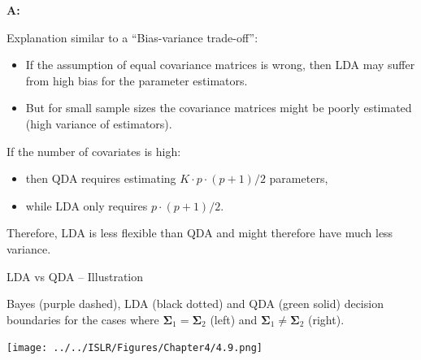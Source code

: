 \documentclass[10pt,ignorenonframetext,]{beamer}
\providecommand{\tightlist}{%
  \setlength{\itemsep}{0pt}\setlength{\parskip}{0pt}}
\begin{document}
\begin{frame}

\textbf{A:}

Explanation similar to a ``Bias-variance trade-off'':

\begin{itemize}
\tightlist
\item
  If the assumption of equal covariance matrices is wrong, then LDA may
  suffer from high bias for the parameter estimators.
\item
  But for small sample sizes the covariance matrices might be poorly
  estimated (high variance of estimators).
\end{itemize}

If the number of covariates is high:

\begin{itemize}
\tightlist
\item
  then QDA requires estimating \(K\cdot p \cdot (p+1)/2\) parameters,
\item
  while LDA only requires \(p\cdot(p+1)/2\).
\end{itemize}

Therefore, LDA is less flexible than QDA and might therefore have much
less variance.

\end{frame}

\begin{frame}

\begin{block}{LDA vs QDA -- Illustration}

\vspace{1mm}

Bayes (purple dashed), LDA (black dotted) and QDA (green solid) decision
boundaries for the cases where
\(\boldsymbol{\Sigma}_1 = \boldsymbol{\Sigma}_2\) (left) and
\(\boldsymbol{\Sigma}_1 \neq \boldsymbol{\Sigma}_2\) (right).

\centering
\texttt{[image: ../../ISLR/Figures/Chapter4/4.9.png]}

\end{block}

\end{frame}
\end{document}
